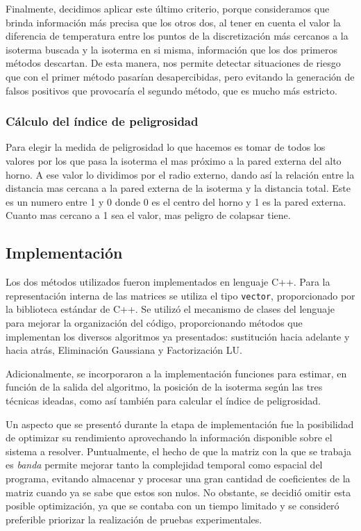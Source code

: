             Finalmente, decidimos aplicar este último criterio, porque consideramos que brinda información más precisa que los otros dos, al tener en cuenta el valor la diferencia de temperatura entre los puntos de la discretización más cercanos a la isoterma buscada y la isoterma en si misma, información que los dos primeros métodos descartan. De esta manera, nos permite detectar situaciones de riesgo que con el primer método pasarían desapercibidas, pero evitando la generación de falsos positivos que provocaría el segundo método, que es mucho más estricto.

        \subsubsection{Cálculo del índice de peligrosidad}

            Para elegir la medida de peligrosidad lo que hacemos es tomar de todos los valores por los que pasa la isoterma el mas próximo a la pared externa del alto horno. A ese valor lo dividimos por el radio externo, dando así la relación entre la distancia mas cercana a la pared externa de la isoterma y la distancia total.
            Este es un numero entre 1 y 0 donde 0 es el centro del horno y 1 es la pared externa. Cuanto mas cercano a 1 sea el valor, mas peligro de colapsar tiene.

    \subsection{Implementación}

        Los dos métodos utilizados fueron implementados en lenguaje C++. Para la representación interna de las matrices se utiliza el tipo \texttt{vector}, proporcionado por la biblioteca estándar de C++. Se utilizó el mecanismo de clases del lenguaje para mejorar la organización del código, proporcionando métodos que implementan los diversos algoritmos ya presentados: sustitución hacia adelante y hacia atrás, Eliminación Gaussiana y Factorización LU.

        Adicionalmente, se incorporaron a la implementación funciones para estimar, en función de la salida del algoritmo, la posición de la isoterma según las tres técnicas ideadas, como así también para calcular el índice de peligrosidad.

        Un aspecto que se presentó durante la etapa de implementación fue la posibilidad de optimizar su rendimiento aprovechando la información disponible sobre el sistema a resolver. Puntualmente, el hecho de que la matriz con la que se trabaja es \emph{banda} permite mejorar tanto la complejidad temporal como espacial del programa, evitando almacenar y procesar una gran cantidad de coeficientes de la matriz cuando ya se sabe que estos son nulos. No obstante, se decidió omitir esta posible optimización, ya que se contaba con un tiempo limitado y se consideró preferible priorizar la realización de pruebas experimentales.
